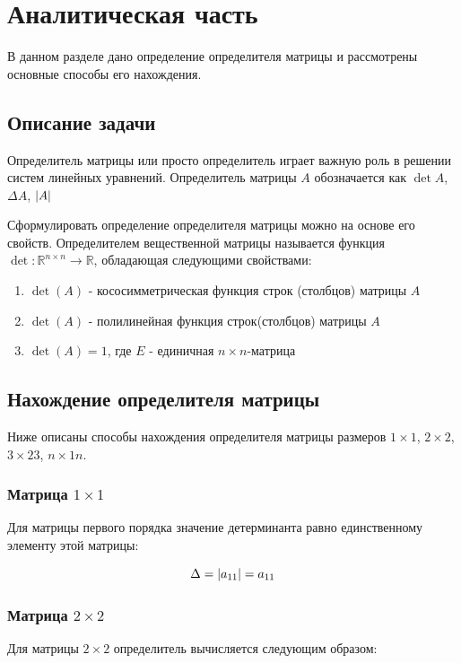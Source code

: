 \documentclass[12pt]{report}
\DeclarePairedDelimiter\abs{\lvert}{\rvert}
\begin{document}
    \chapter{Аналитическая часть}
    В данном разделе дано определение определителя матрицы и рассмотрены основные способы его нахождения.


    \section{Описание задачи}
    Определитель матрицы или просто определитель играет важную роль в решении систем линейных уравнений.
    Определитель матрицы $A$ обозначается как $\det{A}$, $\Delta{A}$, $\abs{A}$

    Сформулировать определение определителя матрицы можно на основе его свойств.
    Определителем вещественной матрицы называется функция $\det{}: \mathbb{R}^{n\times n} \rightarrow \mathbb{R}$,
    обладающая следующими свойствами:

    \begin{enumerate}
        \item $\det{(A)}$ - кососимметрическая функция строк (столбцов) матрицы $A$
        \item $\det{(A)}$ - полилинейная функция строк(столбцов) матрицы $A$
        \item $\det{(A)} = 1$, где $E$ - единичная $n \times n$-матрица
    \end{enumerate}


    \section{Нахождение определителя матрицы}
    Ниже описаны способы нахождения определителя матрицы размеров $1 \times 1$, $2 \times 2$, $3 \times 23$, $n \times 1n$.

    \subsection{Матрица $1 \times 1$}
    Для матрицы первого порядка значение детерминанта равно единственному элементу этой матрицы:

    \begin{equation}
        \label{eq:det_1x1}
        \Delta  = \abs{a_{11}} = a_{11}
    \end{equation}

    \subsection{Матрица $2 \times 2$}
    Для матрицы $2 \times 2$ определитель вычисляется следующим образом:
\end{document}
